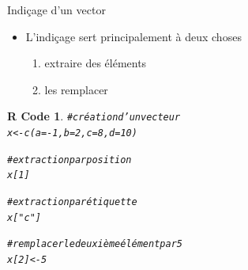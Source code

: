 \documentclass[11pt]{beamer}\usepackage[]{graphicx}\usepackage[]{color}
\makeatletter
\newcommand{\hlnum}[1]{\textcolor[rgb]{0.063,0.58,0.627}{#1}}%
\newcommand{\hlstr}[1]{\textcolor[rgb]{0.063,0.58,0.627}{#1}}%
\newcommand{\hlcom}[1]{\textcolor[rgb]{0.588,0.588,0.588}{#1}}%
\newcommand{\hlopt}[1]{\textcolor[rgb]{0.196,0.196,0.196}{#1}}%
\newcommand{\hlstd}[1]{\textcolor[rgb]{0.196,0.196,0.196}{#1}}%
\newcommand{\hlkwb}[1]{\textcolor[rgb]{0.627,0,0.314}{#1}}%
\newcommand{\hlkwc}[1]{\textcolor[rgb]{0,0.631,0.314}{#1}}%
\newcommand{\hlkwd}[1]{\textcolor[rgb]{0.78,0.227,0.412}{#1}}%
\newenvironment{kframe}{%
 \def\at@end@of@kframe{}%
 \ifinner\ifhmode%
  \def\at@end@of@kframe{\end{minipage}}%
  \begin{minipage}{\columnwidth}%
 \fi\fi%
 \def\FrameCommand##1{\hskip\@totalleftmargin \hskip-\fboxsep
 \colorbox{shadecolor}{##1}\hskip-\fboxsep
     \hskip-\linewidth \hskip-\@totalleftmargin \hskip\columnwidth}%
 \MakeFramed {\advance\hsize-\width
   \@totalleftmargin\z@ \linewidth\hsize
   \@setminipage}}%
 {\par\unskip\endMakeFramed%
 \at@end@of@kframe}
\newenvironment{knitrout}{}{} %
\newtheorem{rcode}{R Code}[section]
\makeatother
\begin{document}
\begin{frame}[fragile]{Indi\c{c}age d'un vector}
\begin{itemize}
  \setlength\itemsep{2em}
\item L'indiçage sert principalement à deux choses
\pause \begin{enumerate}
\normalsize
\item extraire des éléments 
\item les remplacer
\end{enumerate}
\end{itemize}
\pause 
\begin{knitrout}
\color{fgcolor}\begin{kframe}
\begin{rcode}\begin{alltt}
\hlcom{# création d'un vecteur}
\hlstd{x} \hlkwb{<-} \hlkwd{c}\hlstd{(}\hlkwc{a} \hlstd{=} \hlopt{-}\hlnum{1}\hlstd{,} \hlkwc{b} \hlstd{=} \hlnum{2}\hlstd{,} \hlkwc{c} \hlstd{=} \hlnum{8}\hlstd{,} \hlkwc{d} \hlstd{=} \hlnum{10}\hlstd{)}

\hlcom{# extraction par position}
\hlstd{x[}\hlnum{1}\hlstd{]}

\hlcom{# extraction par étiquette}
\hlstd{x[}\hlstr{"c"}\hlstd{]}

\hlcom{# remplacer le deuxième élément par 5}
\hlstd{x[}\hlnum{2}\hlstd{]} \hlkwb{<-} \hlnum{5}
\end{alltt}
\end{rcode}\end{kframe}
\end{knitrout}
\end{frame}
\end{document}
